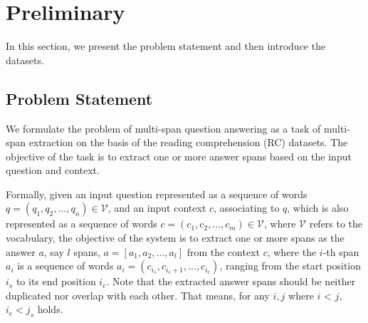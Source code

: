 \documentclass[a4paper]{cas-sc}
\newcommand{\1}[1]{\mathds{1}\left[#1\right]}
\begin{document}
%	
\section{Preliminary}
\label{sec:preliminary}
In this section, we present the problem statement and then introduce the datasets. 
\subsection{Problem Statement}
\label{sec:problem}
We formulate the problem of multi-span question answering as a task of multi-span extraction on the basis of the reading comprehension (RC) datasets. The objective of the task is to extract one or more answer spans based on the input question and context.

Formally, given an input question represented as a sequence of words 
$q=(q_1, q_2, ..., q_n) \in \mathcal{V}$, and an input context $c$, associating to $q$, 
which is also represented as a sequence of words $c=(c_1, c_2, ..., c_m)\in \mathcal{V}$, where $\mathcal{V}$ refers to the vocabulary, 
the objective of the system is to extract one or more spans as the answer $a$, 
say $l$ spans, $a = [a_1, a_2, ..., a_l]$ from the context $c$,
where the $i$-th span $a_i$ is a sequence of words $a_i=(c_{i_s}, c_{i_s+1}, ..., c_{i_e})$, 
ranging from the start position $i_s$ to its end position $i_e$. Note that the extracted answer spans should be neither duplicated nor overlap with each other. That means, for any $i, j$ where $i$ < $j$, $i_e < j_s$ holds. 
\end{document}
